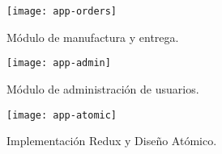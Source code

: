 \begin{figure}[H]
  \centering
  \texttt{[image: app-orders]}
  \caption{Módulo de manufactura y entrega.}
\end{figure}
\vspace{0.8cm}

\begin{figure}[H]
  \centering
  \texttt{[image: app-admin]}
  \caption{Módulo de administración de usuarios.}
\end{figure}
\vspace{0.8cm}

\begin{figure}[H]
  \centering
  \texttt{[image: app-atomic]}
  \caption{Implementación Redux y Diseño Atómico.}
\end{figure}
\vspace{0.8cm}